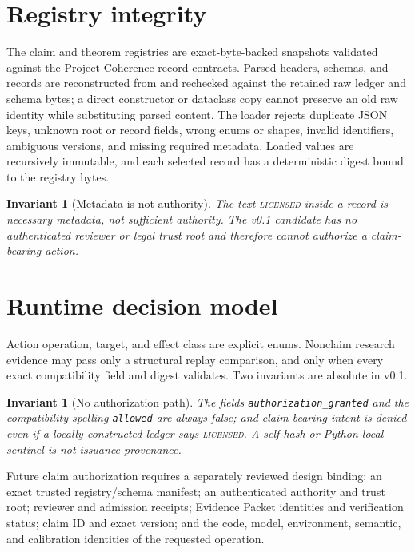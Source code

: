 \documentclass[11pt]{amsart}
\newtheorem{invariant}[theorem]{Invariant}
\theoremstyle{definition}
\theoremstyle{remark}
\begin{document}
\section{Registry integrity}

The claim and theorem registries are exact-byte-backed snapshots validated against the Project Coherence record contracts. Parsed headers, schemas, and records are reconstructed from and rechecked against the retained raw ledger and schema bytes; a direct constructor or dataclass copy cannot preserve an old raw identity while substituting parsed content. The loader rejects duplicate JSON keys, unknown root or record fields, wrong enums or shapes, invalid identifiers, ambiguous versions, and missing required metadata. Loaded values are recursively immutable, and each selected record has a deterministic digest bound to the registry bytes.

\begin{invariant}[Metadata is not authority]
The text \textsc{licensed} inside a record is necessary metadata, not sufficient authority. The v0.1 candidate has no authenticated reviewer or legal trust root and therefore cannot authorize a claim-bearing action.
\end{invariant}

\section{Runtime decision model}

Action operation, target, and effect class are explicit enums. Nonclaim research evidence may pass only a structural replay comparison, and only when every exact compatibility field and digest validates. Two invariants are absolute in v0.1.

\begin{invariant}[No authorization path]\label{inv:noauth}
The fields \texttt{authorization\_granted} and the compatibility spelling \texttt{allowed} are always false; and claim-bearing intent is denied even if a locally constructed ledger says \textsc{licensed}. A self-hash or Python-local sentinel is not issuance provenance.
\end{invariant}

Future claim authorization requires a separately reviewed design binding: an exact trusted registry/schema manifest; an authenticated authority and trust root; reviewer and admission receipts; Evidence Packet identities and verification status; claim ID and exact version; and the code, model, environment, semantic, and calibration identities of the requested operation.
\end{document}
